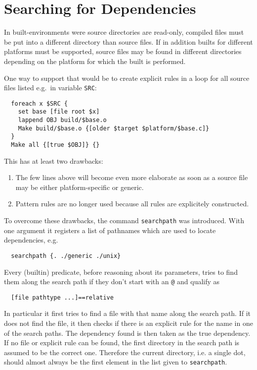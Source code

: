 \documentclass[11pt]{scrartcl}
\begin{document}
\section{Searching for Dependencies}
\label{sec:searchpath}

In built-environments were source directories are read-only, compiled
files must be put into a different directory than source files. If in
addition builts for different platforms must be supported, source
files may be found in different directories depending on the platform
for which the built is performed.

One way to support that would be to create explicit rules in a loop
for all source files listed e.g.\ in variable \texttt{SRC}:
\begin{verbatim}
  foreach x $SRC {
    set base [file root $x]
    lappend OBJ build/$base.o
    Make build/$base.o {[older $target $platform/$base.c]}
  }
  Make all {[true $OBJ]} {}
\end{verbatim}

This has at least two drawbacks:
\begin{enumerate}
\item The few lines above will become even more elaborate as soon as a
  source file may be either platform-specific or generic.
\item Pattern rules are no longer used because all rules are
  explicitely constructed.
\end{enumerate}

To overcome these drawbacks, the command \texttt{searchpath} was
introduced. With one argument it registers a list of pathnames which are
used to locate dependencies, e.g.
\begin{verbatim}
  searchpath {. ./generic ./unix}
\end{verbatim}
Every (builtin) predicate, before reasoning about its parameters,
tries to find them along the search path if they don't start with an
\texttt{@} and qualify as
\begin{verbatim}
  [file pathtype ...]==relative
\end{verbatim}
In particular it first tries to find a file with that name along the
search path. If it does not find the file, it then checks if there is
an explicit rule for the name in one of the search paths. The
dependency found is then taken as the true dependency. If no file or
explicit rule can be found, the first directory in the search path is
assumed to be the correct one. Therefore the current directory, i.e. a
single dot, should almost always be the first element in the list
given to \texttt{searchpath}.
\end{document}
